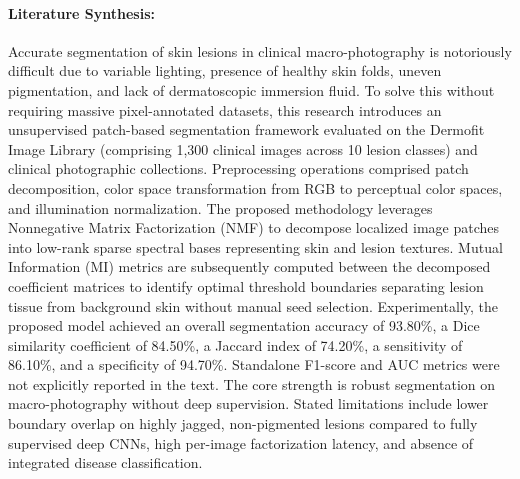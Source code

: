 \paragraph{Literature Synthesis:} Accurate segmentation of skin lesions in clinical macro-photography is notoriously difficult due to variable lighting, presence of healthy skin folds, uneven pigmentation, and lack of dermatoscopic immersion fluid. To solve this without requiring massive pixel-annotated datasets, this research introduces an unsupervised patch-based segmentation framework evaluated on the Dermofit Image Library (comprising 1,300 clinical images across 10 lesion classes) and clinical photographic collections. Preprocessing operations comprised patch decomposition, color space transformation from RGB to perceptual color spaces, and illumination normalization. The proposed methodology leverages Nonnegative Matrix Factorization (NMF) to decompose localized image patches into low-rank sparse spectral bases representing skin and lesion textures. Mutual Information (MI) metrics are subsequently computed between the decomposed coefficient matrices to identify optimal threshold boundaries separating lesion tissue from background skin without manual seed selection. Experimentally, the proposed model achieved an overall segmentation accuracy of 93.80\%, a Dice similarity coefficient of 84.50\%, a Jaccard index of 74.20\%, a sensitivity of 86.10\%, and a specificity of 94.70\%. Standalone F1-score and AUC metrics were not explicitly reported in the text. The core strength is robust segmentation on macro-photography without deep supervision. Stated limitations include lower boundary overlap on highly jagged, non-pigmented lesions compared to fully supervised deep CNNs, high per-image factorization latency, and absence of integrated disease classification.

